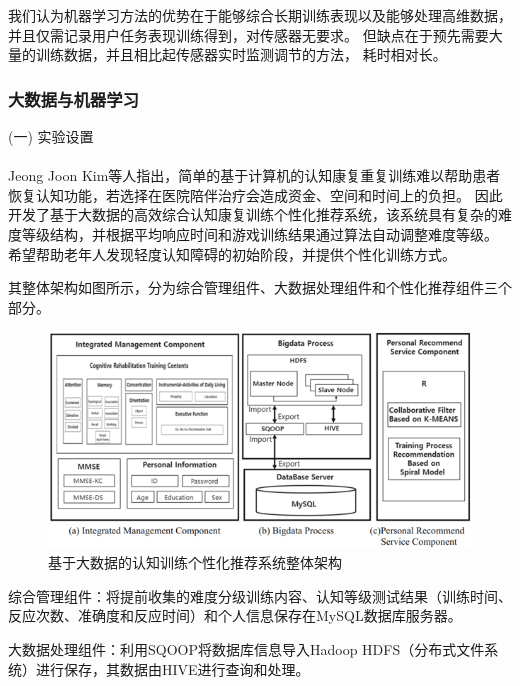 \documentclass{article}
\begin{document}
            我们认为机器学习方法的优势在于能够综合长期训练表现以及能够处理高维数据，
            并且仅需记录用户任务表现训练得到，对传感器无要求。
            但缺点在于预先需要大量的训练数据，并且相比起传感器实时监测调节的方法，
            耗时相对长。

            \subsubsection{大数据与机器学习}
            (一) 实验设置\paragraph{}
            Jeong Joon Kim\cite{ref11}等人指出，简单的基于计算机的认知康复重复训练难以帮助患者恢复认知功能，若选择在医院陪伴治疗会造成资金、空间和时间上的负担。
            因此开发了基于大数据的高效综合认知康复训练个性化推荐系统，该系统具有复杂的难度等级结构，并根据平均响应时间和游戏训练结果通过算法自动调整难度等级。
            希望帮助老年人发现轻度认知障碍的初始阶段，并提供个性化训练方式。

            其整体架构如图所示，分为综合管理组件、大数据处理组件和个性化推荐组件三个部分。
            \begin{figure}[H]
            	
            	\centering
            	\includegraphics[scale=0.7]{images/Overall_architecture.png}
            	\caption{基于大数据的认知训练个性化推荐系统整体架构}
            	\label{fig:label}
            \end{figure}

            综合管理组件：将提前收集的难度分级训练内容、认知等级测试结果（训练时间、反应次数、准确度和反应时间）和个人信息保存在MySQL数据库服务器。
 
            大数据处理组件：利用SQOOP将数据库信息导入Hadoop HDFS（分布式文件系统）进行保存，其数据由HIVE进行查询和处理。
\end{document}
